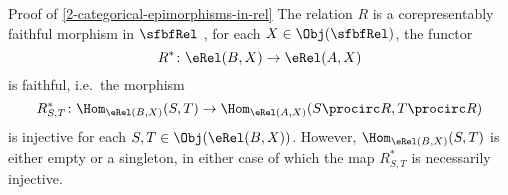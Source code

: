 \begin{Proof}{Proof of \cref{2-categorical-epimorphisms-in-rel}}%
    The relation $R$ is a corepresentably faithful morphism in $\sfbfRel$ \textiff, for each $X\in\Obj(\sfbfRel)$, the functor
    \[
        R^{*}%
        \colon%
        \eRel(B,X)%
        \to%
        \eRel(A,X)%
    \]%
    is faithful, i.e.\ \textiff the morphism
    \[
        R^{*}_{S,T}%
        \colon%
        \Hom_{\eRel(B,X)}(S,T)%
        \to%
        \Hom_{\eRel(A,X)}(S\procirc R,T\procirc R)%
    \]%
    is injective for each $S,T\in\Obj(\eRel(B,X))$. However, $\Hom_{\eRel(B,X)}(S,T)$ is either empty or a singleton, in either case of which the map $R^{*}_{S,T}$ is necessarily injective.


\end{Proof}

